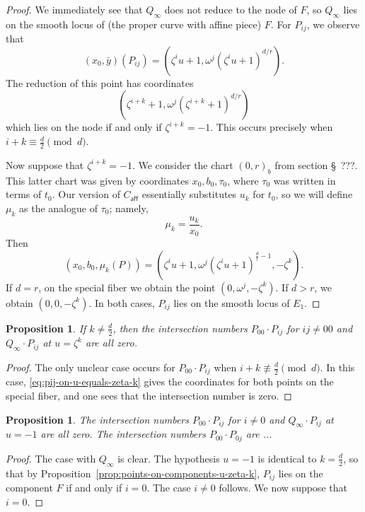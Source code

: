 \documentclass[pagesize,paper=letter]{scrartcl}
\newtheorem{proposition}[thm]{Proposition}
\theoremstyle{definition}
\theoremstyle{remark}
\def\caff{C_{\textsf{aff}}}
\begin{document}
\begin{proof}
  We immediately see that $Q_\infty$ does not reduce to the node of $F$, so $Q_\infty$ lies on the smooth locus of (the proper curve with affine piece) $F$. For $P_{ij}$, we observe that
  \[
  (x_0, \bar{y})(P_{ij}) = (\zeta^i u + 1, \omega^j (\zeta^i u + 1)^{d/r}).
  \]
  The reduction of this point has coordinates
  \begin{equation}
    (\zeta^{i+k} + 1, \omega^j(\zeta^{i+k} + 1)^{d/r})\label{eq:pij-on-u-equals-zeta-k}
  \end{equation}
    which lies on the node if and only if $\zeta^{i+k} = -1$. This occurs precisely when $i + k \equiv \frac{d}{2} \pmod{d}$.

  Now suppose that $\zeta^{i+k} = -1$. We consider the chart $(0,r)_b$ from section \S~???. This latter chart was given by coordinates $x_0, b_0, \tau_0$, where $\tau_0$ was written in terms of $t_0$. Our version of $\caff$ essentially substitutes $u_k$ for $t_0$, so we will define $\mu_k$ as the analogue of $\tau_0$; namely,
  \[
  \mu_k = \frac{u_k}{x_0}.
  \]
  Then
  \[
  (x_0, b_0, \mu_k(P)) = (\zeta^iu + 1, \omega^j(\zeta^i u + 1)^{\frac{d}{r} - 1}, -\zeta^k).
  \]
  If $d = r$, on the special fiber we obtain the point $(0, \omega^j, -\zeta^k)$. If $d > r$, we obtain $(0, 0, -\zeta^k)$. In both cases, $P_{ij}$ lies on the smooth locus of $E_1$.
\end{proof}

\begin{proposition}\label{prop:local-intersections-u-zeta-k}
  If $k \neq \frac{d}{2}$, then the intersection numbers $P_{00} \cdot P_{ij}$ for $ij \neq 00$ and $Q_{\infty} \cdot P_{ij}$ at $u = \zeta^k$ are all zero.
\end{proposition} 

\begin{proof}
  The only unclear case occurs for $P_{00} \cdot P_{ij}$ when $i + k \not\equiv \frac{d}{2} \pmod{d}$. In this case, \eqref{eq:pij-on-u-equals-zeta-k} gives the coordinates for both points on the special fiber, and one sees that the intersection number is zero.
\end{proof}

\begin{proposition}\label{prop:local-intersections-u-minus-1}
  The intersection numbers $P_{00} \cdot P_{ij}$ for $i \neq 0$ and $Q_{\infty} \cdot P_{ij}$ at $u = -1$ are all zero. The intersection numbers $P_{00} \cdot P_{0j}$ are ...
\end{proposition}

\begin{proof}
  The case with $Q_\infty$ is clear. The hypothesis $u = -1$ is identical to $k = \frac{d}{2}$, so that by Proposition~\ref{prop:points-on-components-u-zeta-k}, $P_{ij}$ lies on the component $F$ if and only if $i = 0$. The case $i \neq 0$ follows. We now suppose that $i = 0$. 
\end{proof}
\end{document}
